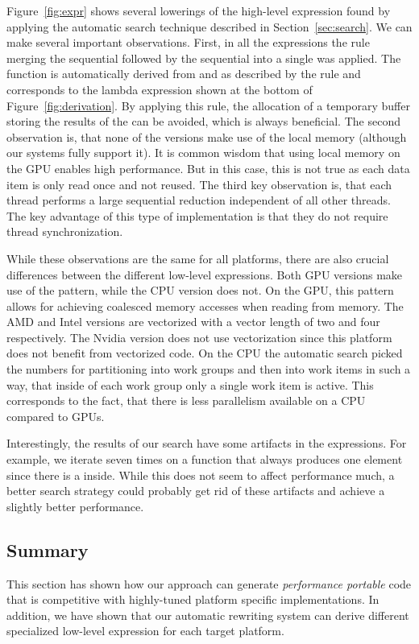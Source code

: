 Figure~\ref{fig:expr} shows several lowerings of the high-level expression found by applying the automatic search technique described in Section~\ref{sec:search}.
We can make several important observations.
First, in all the expressions the rule merging the sequential  followed by the sequential  into a single  was applied.
The function  is automatically derived from  and \pat{+} as described by the rule and corresponds to the lambda expression shown at the bottom of Figure~\ref{fig:derivation}.
By applying this rule, the allocation of a temporary buffer storing the results of the  can be avoided, which is always beneficial.
The second observation is, that none of the versions make use of the local memory (although our systems fully support it).
It is common wisdom that using local memory on the GPU enables high
performance.
But in this case, this is not true as each data item is only read once and not reused.
The third key observation is, that each thread performs a large sequential reduction independent of all other threads.
The key advantage of this type of implementation is that they do not require thread synchronization.

While these observations are the same for all platforms, there are also crucial differences between the different low-level expressions.
Both GPU versions make use of the  pattern, while the CPU version does not.
On the GPU, this pattern allows for achieving coalesced memory accesses when reading from memory.
The AMD and Intel versions are vectorized with a vector length of two and four respectively.
The Nvidia version does not use vectorization since this platform does not benefit from vectorized code.
On the CPU the automatic search picked the numbers for partitioning into work groups and then into work items in such a way, that inside of each work group only a single work item is active.
This corresponds to the fact, that there is less parallelism available on a CPU compared to GPUs.

Interestingly, the results of our search have some artifacts in the expressions.
For example, we iterate seven times on a function that always produces one element since there is a  inside.
While this does not seem to affect performance much, a better search strategy could probably get rid of these artifacts and achieve a slightly better performance.

\subsection{Summary}

This section has shown how our approach can generate \emph{performance portable} code that is competitive with highly-tuned platform specific implementations.
In addition, we have shown that our automatic rewriting system can derive different specialized low-level expression for each target platform.

